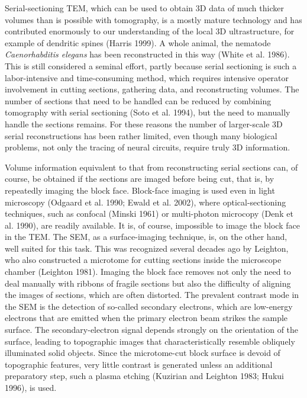 \documentclass{article}
\begin{document}
Serial-sectioning TEM, which can be used to obtain 3D data of much thicker volumes than is possible with tomography, is a mostly mature technology and has contributed enormously to our understanding of the local 3D ultrastructure, for example of dendritic spines (Harris 1999). A whole animal, the nematode \emph{Caenorhabditis elegans} has been reconstructed in this way (White et al. 1986). This is still considered a seminal effort, partly because serial sectioning is such a labor-intensive and time-consuming method, which requires intensive operator involvement in cutting sections, gathering data, and reconstructing volumes. The number of sections that need to be handled can be reduced by combining tomography with serial sectioning (Soto et al. 1994), but the need to manually handle the sections remains. For these reasons the number of larger-scale 3D serial reconstructions has been rather limited, even though many biological problems, not only the tracing of neural circuits, require truly 3D information.

Volume information equivalent to that from reconstructing serial sections can, of course, be obtained if the sections are imaged before being cut, that is, by repeatedly imaging the block face. Block-face imaging is used even in light microscopy (Odgaard et al. 1990; Ewald et al. 2002), where optical-sectioning techniques, such as confocal (Minski 1961) or multi-photon microcopy (Denk et al. 1990), are readily available. It is, of course, impossible to image the block face in the TEM. The SEM, as a surface-imaging technique, is, on the other hand, well suited for this task. This was recognized several decades ago by Leighton, who also constructed a microtome for cutting sections inside the microscope chamber (Leighton 1981). Imaging the block face removes not only the need to deal manually with ribbons of fragile sections but also the difficulty of aligning the images of sections, which are often distorted. The prevalent contrast mode in the SEM is the detection of so-called secondary electrons, which are low-energy electrons that are emitted when the primary electron beam strikes the sample surface. The secondary-electron signal depends strongly on the orientation of the surface, leading to topographic images that characteristically resemble obliquely illuminated solid objects. Since the microtome-cut block surface is devoid of topographic features, very little contrast is generated unless an additional preparatory step, such a plasma etching (Kuzirian and Leighton 1983; Hukui 1996), is used.
\end{document}
